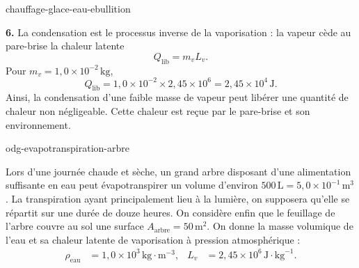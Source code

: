 \begin{exo}{chauffage-glace-eau-ebullition}
\begin{solution}
\textbf{6.} La condensation est le processus inverse de la vaporisation : la vapeur cède au pare-brise la chaleur latente
\[
Q_{\text{lib}}=m_vL_v.
\]
Pour $m_v=1{,}0\times10^{-2}\,\text{kg}$,
\[
Q_{\text{lib}}=1{,}0\times10^{-2}\times2{,}45\times10^6
=2{,}45\times10^4\,\text{J}.
\]
Ainsi, la condensation d'une faible masse de vapeur peut libérer une quantité de chaleur non négligeable. Cette chaleur est reçue par le pare-brise et son environnement.
\end{solution}

\end{exo}

\begin{exo}{odg-evapotranspiration-arbre}

Lors d’une journée chaude et sèche, un grand arbre disposant d’une
alimentation suffisante en eau peut évapotranspirer un volume
d’environ \(500\,\text{L}=5{,}0\times10^{-1}\,\text{m}^3\). La transpiration ayant principalement
lieu à la lumière, on supposera qu’elle se répartit sur une
durée de douze heures. On considère enfin que le feuillage
de l’arbre couvre au sol une surface \(A_{\text{arbre}}=50\,\text{m}^2\).
On donne la masse volumique de l'eau et sa chaleur latente de vaporisation à pression atmosphérique :
\[
\begin{aligned}
\rho_{\text{eau}}&=1{,}0\times10^3\,\text{kg}\!\cdot\!\text{m}^{-3},
&L_v&=2{,}45\times10^6\,\text{J}\!\cdot\!\text{kg}^{-1}.
\end{aligned}
\]


\end{exo}
